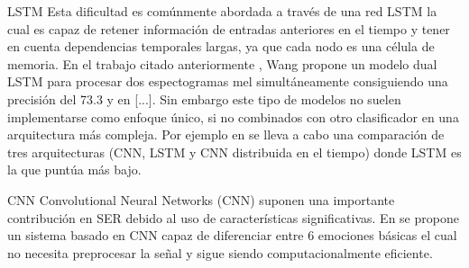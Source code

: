 \documentclass[11pt,a4paper,spanish]{book}
\begin{document}
	LSTM
	Esta dificultad es comúnmente abordada a través de una red LSTM la cual es capaz de retener información de entradas anteriores en el tiempo y tener en cuenta dependencias temporales largas, ya que cada nodo es una célula de memoria.
	En el trabajo citado anteriormente \cite{Wang2020}, Wang propone un modelo dual LSTM para procesar dos espectogramas mel simultáneamente consiguiendo una precisión del 73.3 y en [...]. 
	Sin embargo este tipo de modelos no suelen implementarse como enfoque único, si no combinados con otro clasificador en una arquitectura más compleja. Por ejemplo en \cite{Lim2017} se lleva a cabo una comparación de tres  arquitecturas (CNN, LSTM y CNN distribuida en el tiempo) donde LSTM es la que puntúa más bajo.
	
	CNN
	Convolutional Neural Networks (CNN) suponen una importante contribución en SER debido al uso de características significativas. En %
	se propone un sistema basado en CNN capaz de diferenciar entre 6 emociones básicas el cual no necesita preprocesar la señal y sigue siendo computacionalmente eficiente.
	
	
	\printbibliography
	
\end{document}
